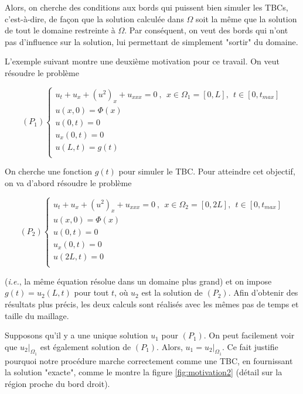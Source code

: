\indent

\indent Alors, on cherche des conditions aux bords qui puissent bien simuler les TBCs, c'est-à-dire, de façon que la solution calculée dans $\Omega$ soit la même que la solution de tout le domaine restreinte à $\Omega$. Par conséquent, on veut des bords qui n'ont pas d'influence sur la solution, lui permettant de simplement "sortir" du domaine.

\indent L'exemple suivant montre une deuxième motivation pour ce travail. On veut résoudre le problème 

\begin{equation*}
    (P_1) \begin{cases}
    u_t + u_x + (u^2)_x + u_{xxx} = 0 \ , \ \ x \in \Omega_1 = [0,L], \ \ t \in [0, t_{max}] \\
    u(x,0) = \Phi(x) \\
    u(0,t) = 0 \\
    u_x(0,t) = 0 \\
    u(L,t) = g(t)  \\ 
    \end{cases}
\end{equation*}

\indent On cherche une fonction  $g(t)$ pour simuler le TBC. Pour atteindre cet objectif, on va d'abord résoudre le problème

\begin{equation*}
    (P_2) \begin{cases}
    u_t + u_x + (u^2)_x + u_{xxx} = 0 \ , \ \ x \in \Omega_2 = [0,2L], \ \ t \in [0, t_{max}] \\
    u(x,0) = \Phi(x) \\
    u(0,t) = 0 \\
    u_x(0,t) = 0 \\
    u(2L,t) = 0  \\ 
    \end{cases}
\end{equation*}

\noindent (\emph{i.e.}, la même équation résolue dans un domaine plus grand) et on impose $g(t) = u_2(L,t)$ pour tout $t$, où $u_2$ est la solution de $(P_2)$. Afin d'obtenir des résultats plus précis, les deux calculs sont réalisés avec les mêmes pas de temps et taille du maillage.

\indent Supposons qu'il y a une unique solution $u_1$ pour $(P_1)$. On peut facilement voir que $u_2|_{\Omega_1}$ est également solution de $(P_1)$. Alors, $u_1 = u_2|_{\Omega_1}$. Ce fait justifie pourquoi notre procédure marche correctement comme une TBC, en fournissant la solution "exacte", comme le montre la figure \ref{fig:motivation2}  (détail sur la région proche du bord droit).

